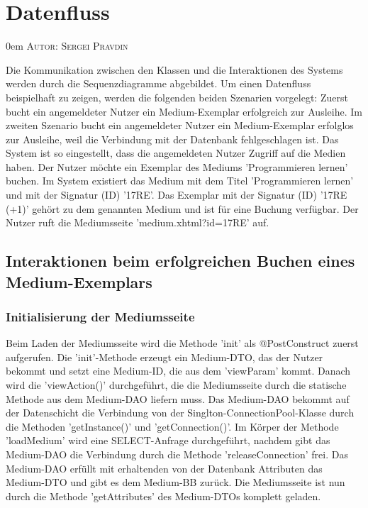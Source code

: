 \documentclass{article}
\makeatletter
\newcommand{\sectionauthor}[1]{
	{\parindent 0em \large \scshape Autor: #1 \par \nobreak \vspace*{1em}}
	\@afterheading
}
\makeatother
\begin{document}
\newpage
\section{Datenfluss}
\sectionauthor{Sergei Pravdin}
Die Kommunikation zwischen den Klassen und die Interaktionen des Systems werden durch die Sequenzdiagramme abgebildet. Um einen Datenfluss beispielhaft zu zeigen, werden die folgenden beiden Szenarien vorgelegt: Zuerst bucht ein angemeldeter Nutzer ein Medium-Exemplar erfolgreich zur Ausleihe. Im zweiten Szenario bucht ein angemeldeter Nutzer ein Medium-Exemplar erfolglos zur Ausleihe, weil die Verbindung mit der Datenbank fehlgeschlagen ist. Das System ist so eingestellt, dass die angemeldeten Nutzer Zugriff auf die Medien haben. Der Nutzer möchte ein Exemplar des Mediums 'Programmieren lernen' buchen. Im System existiert das Medium mit dem Titel 'Programmieren lernen' und mit der Signatur (ID) '17RE'. Das Exemplar mit der Signatur (ID) '17RE (+1)' gehört zu dem genannten Medium und ist für eine Buchung verfügbar. Der Nutzer ruft die Mediumsseite 'medium.xhtml?id=17RE' auf.
\subsection{Interaktionen beim erfolgreichen Buchen eines Medium-Exemplars}
\subsubsection{Initialisierung der Mediumsseite}
Beim Laden der Mediumsseite wird die Methode 'init' als @PostConstruct zuerst aufgerufen. Die 'init'-Methode erzeugt ein Medium-DTO, das der Nutzer bekommt und setzt eine Medium-ID, die aus dem 'viewParam' kommt. Danach wird die 'viewAction()' durchgeführt, die die Mediumsseite durch die statische Methode aus dem Medium-DAO liefern muss. Das Medium-DAO bekommt auf der Datenschicht die Verbindung von der Singlton-ConnectionPool-Klasse durch die Methoden 'getInstance()' und 'getConnection()'. Im Körper der Methode 'loadMedium' wird eine SELECT-Anfrage durchgeführt, nachdem gibt das Medium-DAO die Verbindung durch die Methode 'releaseConnection' frei. Das Medium-DAO erfüllt mit erhaltenden von der Datenbank Attributen das Medium-DTO und gibt es dem Medium-BB zurück. Die Mediumsseite ist nun durch die Methode 'getAttributes' des Medium-DTOs komplett geladen.
\end{document}
